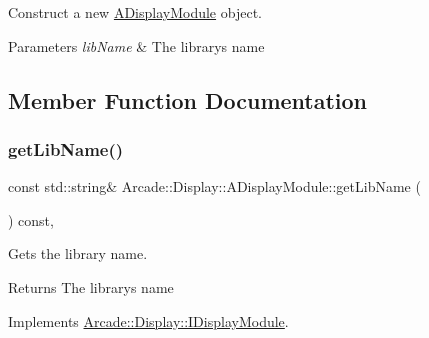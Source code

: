 Construct a new \mbox{\hyperlink{classArcade_1_1Display_1_1ADisplayModule}{A\+Display\+Module}} object. 


\begin{DoxyParams}{Parameters}
{\em lib\+Name} & The library\textquotesingle{}s name \\
\hline
\end{DoxyParams}


\subsection{Member Function Documentation}
\mbox{\label{classArcade_1_1Display_1_1ADisplayModule_a0f7d98b279058994f41978b17bb14222}} 
\subsubsection{\texorpdfstring{getLibName()}{getLibName()}}
{\footnotesize\ttfamily const std\+::string\& Arcade\+::\+Display\+::\+A\+Display\+Module\+::get\+Lib\+Name (\begin{DoxyParamCaption}{ }\end{DoxyParamCaption}) const\hspace{0.3cm}{\ttfamily [final]}, {\ttfamily [virtual]}}



Gets the library name. 

\begin{DoxyReturn}{Returns}
The library\textquotesingle{}s name 
\end{DoxyReturn}


Implements \mbox{\hyperlink{classArcade_1_1Display_1_1IDisplayModule_a0d8e957815e94766bdefbd7a5043e81a}{Arcade\+::\+Display\+::\+I\+Display\+Module}}.

